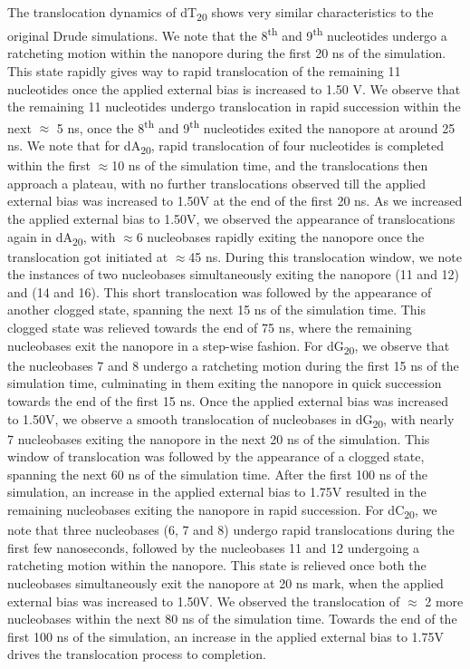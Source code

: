 The translocation dynamics of dT\textsubscript{20} shows very similar characteristics to the original Drude simulations. We note that the 8\textsuperscript{th} and 9\textsuperscript{th} nucleotides undergo a ratcheting motion within the nanopore during the first 20 ns of the simulation. This state rapidly gives way to rapid translocation of the remaining 11 nucleotides once the applied external bias is increased to 1.50 V. We observe that the remaining 11 nucleotides undergo translocation in rapid succession within the next $\approx$ 5 ns, once the 8\textsuperscript{th} and 9\textsuperscript{th} nucleotides exited the nanopore at around 25 ns. We note that for dA\textsubscript{20}, rapid translocation of four nucleotides is completed within the first $\approx$10 ns of the simulation time, and the translocations then approach a plateau, with no further translocations observed till the applied external bias was increased to 1.50V at the end of the first 20 ns. As we increased the applied external bias to 1.50V, we observed the appearance of translocations again in dA\textsubscript{20}, with $\approx$6 nucleobases rapidly exiting the nanopore once the translocation got initiated at $\approx$45 ns. During this translocation window, we note the instances of two nucleobases simultaneously exiting the nanopore (11 and 12) and (14 and 16). This short translocation was followed by the appearance of another clogged state, spanning the next 15 ns of the simulation time. This clogged state was relieved towards the end of 75 ns, where the remaining nucleobases exit the nanopore in a step-wise fashion. For dG\textsubscript{20}, we observe that the nucleobases 7 and 8 undergo a ratcheting motion during the first 15 ns of the simulation time, culminating in them exiting the nanopore in quick succession towards the end of the first 15 ns. Once the applied external bias was increased to 1.50V, we observe a smooth translocation of nucleobases in dG\textsubscript{20}, with nearly 7 nucleobases exiting the nanopore in the next 20 ns of the simulation. This window of translocation was followed by the appearance of a clogged state, spanning the next 60 ns of the simulation time. After the first 100 ns of the simulation, an increase in the applied external bias to 1.75V resulted in the remaining nucleobases exiting the nanopore in rapid succession. For dC\textsubscript{20}, we note that three nucleobases (6, 7 and 8) undergo rapid translocations during the first few nanoseconds, followed by the nucleobases 11 and 12 undergoing a ratcheting motion within the nanopore. This state is relieved once both the nucleobases simultaneously exit the nanopore at 20 ns mark, when the applied external bias was increased to 1.50V. We observed the translocation of $\approx$ 2 more nucleobases within the next 80 ns of the simulation time. Towards the end of the first 100 ns of the simulation, an increase in the applied external bias to 1.75V drives the translocation process to completion. 

